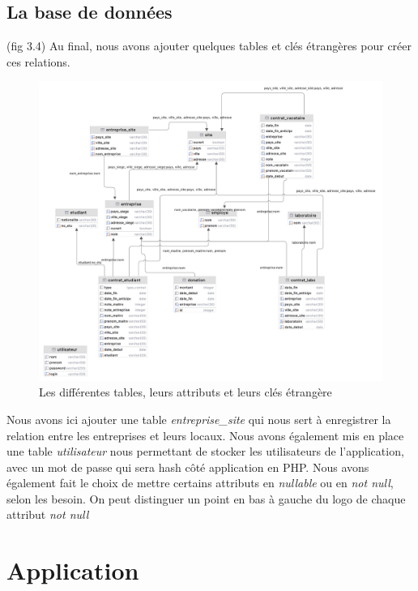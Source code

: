 \documentclass[french,12pt,a4paper,titlepage]{report}
\begin{document}
		\subsection{La base de données} (fig 3.4)
	Au final, nous avons ajouter quelques tables et clés étrangères pour  créer ces relations.
	\clearpage
		\begin{figure}[ht]
			\centering
			\includegraphics[width=1\linewidth]{rapports_assets/diag_table_complete.png} 
			\caption{Les différentes tables, leurs attributs et leurs clés étrangère}
		\end{figure}
		Nous avons ici ajouter une table \textit{entreprise\_site} qui nous sert à enregistrer la relation entre les entreprises et leurs locaux.
		\newline
		Nous avons également mis en place une table \textit{utilisateur} nous permettant de stocker les utilisateurs de l'application, avec un mot de passe qui sera hash côté application en PHP.
		Nous avons également fait le choix de mettre certains attributs en \textit{nullable} ou en \textit{not null}, selon les besoin. On peut distinguer un point en bas à gauche du logo de chaque attribut \textit{not null}

		\section{Application}
\end{document}
